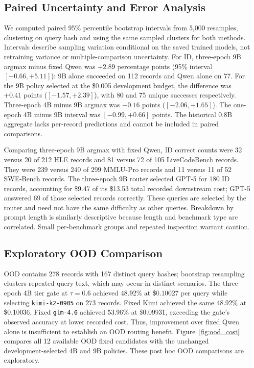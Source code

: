 \documentclass[11pt,a4paper]{article}
\begin{document}
\subsection{Paired Uncertainty and Error Analysis}
\label{subsec:paired_uncertainty}

We computed paired 95\% percentile bootstrap intervals from 5,000 resamples, clustering on query hash and using the same sampled clusters for both methods. Intervals describe sampling variation conditional on the saved trained models, not retraining variance or multiple-comparison uncertainty. For ID, three-epoch 9B argmax minus fixed Qwen was $+2.89$ percentage points (95\% interval $[+0.66,+5.11]$): 9B alone succeeded on 112 records and Qwen alone on 77. For the 9B policy selected at the \$0.005 development budget, the difference was $+0.41$ points ($[-1.57,+2.39]$), with 80 and 75 unique successes respectively. Three-epoch 4B minus 9B argmax was $-0.16$ points ($[-2.06,+1.65]$). The one-epoch 4B minus 9B interval was $[-0.99,+0.66]$ points. The historical 0.8B aggregate lacks per-record predictions and cannot be included in paired comparisons.

Comparing three-epoch 9B argmax with fixed Qwen, ID correct counts were 32 versus 20 of 212 HLE records and 81 versus 72 of 105 LiveCodeBench records. They were 239 versus 240 of 299 MMLU-Pro records and 11 versus 11 of 52 SWE-Bench records. The three-epoch 9B router selected GPT-5 for 180 ID records, accounting for \$9.47 of its \$13.53 total recorded downstream cost; GPT-5 answered 69 of those selected records correctly. These queries are selected by the router and need not have the same difficulty as other queries. Breakdown by prompt length is similarly descriptive because length and benchmark type are correlated. Small per-benchmark groups and repeated inspection warrant caution.

\subsection{Exploratory OOD Comparison}
\label{subsec:ood_baselines}

OOD contains 278 records with 167 distinct query hashes; bootstrap resampling clusters repeated query text, which may occur in distinct scenarios. The three-epoch 4B tier gate at $\tau=0.6$ achieved 48.92\% at \$0.10027 per query while selecting \texttt{kimi-k2-0905} on 273 records. Fixed Kimi achieved the same 48.92\% at \$0.10036. Fixed \texttt{glm-4.6} achieved 53.96\% at \$0.09931, exceeding the gate's observed accuracy at lower recorded cost. Thus, improvement over fixed Qwen alone is insufficient to establish an OOD routing benefit. Figure~\ref{fig:ood_cost} compares all 12 available OOD fixed candidates with the unchanged development-selected 4B and 9B policies. These post hoc OOD comparisons are exploratory.
\end{document}
